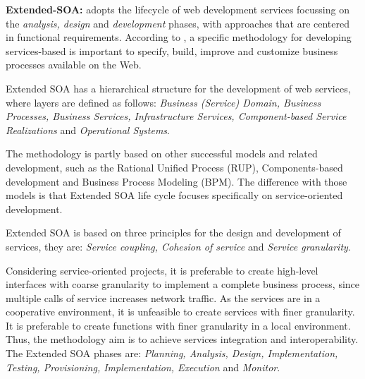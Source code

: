 
\bigskip

\textbf{Extended-SOA:} \cite{PapazoglouH06} adopts the lifecycle
of web development services focussing on the \textit{analysis, design}
and \textit{development} phases, with approaches that are centered in
functional requirements.  According to \cite{PapazoglouH06}, a specific
methodology for developing services-based is important to specify, build, improve and customize business processes available on the Web. 

Extended SOA has a hierarchical structure for the development of web
services, where layers are defined as follows: \textit{Business (Service)
Domain, Business Processes, Business Services, Infrastructure Services,
Component-based Service Realizations} and \textit{Operational Systems}.

The methodology is partly based on other successful models and
related development, such as the Rational Unified Process (RUP),
Components-based development and Business Process Modeling (BPM). The difference
with those models is that Extended SOA life cycle focuses specifically on
service-oriented development.

Extended SOA is based on three principles for the design and development of
services, they are: \textit{Service coupling, Cohesion of service}
and \textit{Service granularity}.

Considering service-oriented projects, it is preferable to create high-level
interfaces with coarse granularity to implement a complete business process,
since multiple calls of service increases network traffic.
As the services are in a cooperative environment, it is unfeasible to create
services with finer granularity. It is preferable to create functions with
finer granularity in a local environment. Thus, the methodology aim is to
achieve services integration and interoperability. The Extended SOA phases are:
\textit{Planning, Analysis, Design, Implementation, Testing,
Provisioning, Implementation, Execution} and \textit{Monitor}.


